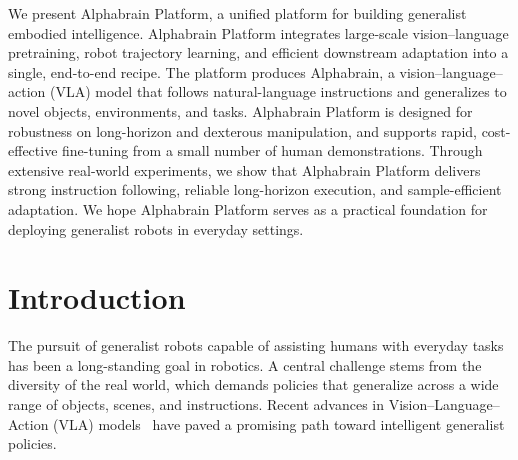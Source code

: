 \documentclass[11pt]{article}
\newcommand{\model}{\mbox{Alphabrain}}
\newcommand{\platform}{Alphabrain Platform}
\begin{document}



\begin{ababstract}
\abstractheading
We present \platform{}, a unified platform for building generalist embodied
intelligence. \platform{} integrates large-scale vision–language pretraining,
robot trajectory learning, and efficient downstream adaptation into a single,
end-to-end recipe. The platform produces \model{}, a vision–language–action
(VLA) model that follows natural-language instructions and generalizes to novel
objects, environments, and tasks. \platform{} is designed for robustness on
long-horizon and dexterous manipulation, and supports rapid, cost-effective
fine-tuning from a small number of human demonstrations. Through extensive
real-world experiments, we show that \platform{} delivers strong instruction
following, reliable long-horizon execution, and sample-efficient adaptation. We
hope \platform{} serves as a practical foundation for deploying generalist
robots in everyday settings.

\vspace{8pt}
\end{ababstract}

\section{Introduction}\label{sec:intro}
The pursuit of generalist robots capable of assisting humans with everyday tasks
has been a long-standing goal in robotics. A central challenge stems from the
diversity of the real world, which demands policies that generalize across a wide
range of objects, scenes, and instructions. Recent advances in
Vision–Language–Action (VLA) models~\citep{example2025} have paved a promising
path toward intelligent generalist policies.
\end{document}
